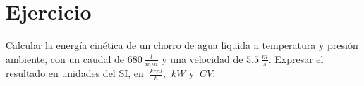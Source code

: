 \section{Ejercicio}\label{ej:Chap01Ejercicio05}
Calcular la energía cinética de un chorro de agua líquida a temperatura y presión ambiente, con un caudal de $\SI{680}{\frac{l}{min}}$ y una velocidad de $\SI{5.5}{\frac{m}{s}}$. Expresar el resultado en unidades del SI, en $\SI{}{\frac{kcal}{h}}$, $\SI{}{kW}$ y $\SI{}{CV}$.